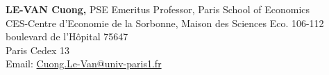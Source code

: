 \documentclass[margin,line]{res}
\begin{document}
\begin{resume}
\par
\parbox{\textwidth}{
{\bf LE-VAN Cuong,} PSE Emeritus Professor, Paris School of Economics\\
CES-Centre d'Economie de la Sorbonne, Maison des Sciences Eco. 106-112 boulevard de l'Hôpital 75647 \\
Paris Cedex 13 \\
Email: \href{mailto:Cuong.Le-Van@univ-paris1.fr}{Cuong.Le-Van@univ-paris1.fr}}

\end{resume}
\end{document}
